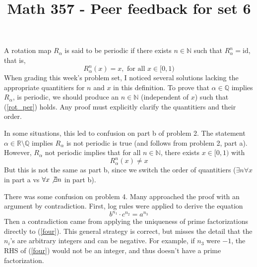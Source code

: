 \documentclass[12pt, reqno]{amsart}
\theoremstyle{definition}
\theoremstyle{remark}
\begin{document}
\title[Math 357 - Harmonic Analysis]{Math 357 - Peer feedback for set 6}   %



\vspace*{-40 pt}

\maketitle

\vspace*{-20 pt}

\section*{}




A rotation map $R_\alpha$ is said to be periodic if there exists $n\in\mathbb{N}$ such that $R_\alpha^n=\text{id}$, that is, 
\begin{equation} \label{rot_per}
    R_\alpha^n(x)=x,\text{ for all }x\in[0,1)
\end{equation}
When grading this week's problem set, I noticed several solutions lacking the appropriate quantitiers for $n$ and $x$ in this definition. To prove that $\alpha\in\mathbb{Q}$ implies $R_\alpha$, is periodic, we should produce an $n\in\mathbb{N}$ (independent of $x$) such that (\ref{rot_per}) holds. Any proof must explicitly clarify the quantitiers and their order.

In some situations, this led to confusion on part b of problem 2. The statement $\alpha\in\mathbb{R}\setminus\mathbb{Q}$ implies $R_\alpha$ is not periodic is true (and follows from problem 2, part a). However, $R_\alpha$ not periodic implies that for all $n\in\mathbb{N}$, there exists $x\in[0,1)$ with 
\[
    R_\alpha^n(x)\ne x
\]
But this is not the same as part b, since we switch the order of quantitiers ($\exists n\forall x$ in part a vs $\forall x\not\exists n$ in part b).



There was some confusion on problem 4. Many approached the proof with an argument by contradiction. First, log rules were applied to derive the equation
\begin{equation} \label{four}
    b^{n_1}\cdot c^{n_2}=a^{n_3}
\end{equation}
Then a contradiction came from applying the uniqueness of prime factorizations directly to (\ref{four}). 
This general strategy is correct, but misses the detail that the $n_i$'s are arbitrary integers and can be negative. For example, if $n_3$ were $-1$, the RHS of (\ref{four}) would not be an integer, and thus doesn't have a prime factorization.
\end{document}
